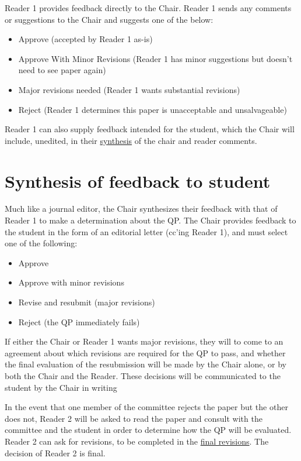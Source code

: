 \documentclass[
]{book}
\providecommand{\tightlist}{%
  \setlength{\itemsep}{0pt}\setlength{\parskip}{0pt}}
\begin{document}
Reader 1 provides feedback directly to the Chair. Reader 1 sends any comments or suggestions to the Chair and suggests one of the below:

\begin{itemize}
\tightlist
\item
  Approve (accepted by Reader 1 as-is)
\item
  Approve With Minor Revisions (Reader 1 has minor suggestions but doesn't need to see paper again)
\item
  Major revisions needed (Reader 1 wants substantial revisions)
\item
  Reject (Reader 1 determines this paper is unacceptable and unsalvageable)
\end{itemize}

Reader 1 can also supply feedback intended for the student, which the Chair will include, unedited, in their \protect\hyperlink{synthesis}{synthesis} of the chair and reader comments.

\hypertarget{synthesis}{%
\section{Synthesis of feedback to student}\label{synthesis}}

Much like a journal editor, the Chair synthesizes their feedback with that of Reader 1 to make a determination about the QP. The Chair provides feedback to the student in the form of an editorial letter (cc'ing Reader 1), and must select one of the following:

\begin{itemize}
\tightlist
\item
  Approve
\item
  Approve with minor revisions
\item
  Revise and resubmit (major revisions)
\item
  Reject (the QP immediately fails)
\end{itemize}

If either the Chair or Reader 1 wants major revisions, they will to come to an agreement about which revisions are required for the QP to pass, and whether the final evaluation of the resubmission will be made by the Chair alone, or by both the Chair and the Reader. These decisions will be communicated to the student by the Chair in writing

In the event that one member of the committee rejects the paper but the other does not, Reader 2 will be asked to read the paper and consult with the committee and the student in order to determine how the QP will be evaluated. Reader 2 can ask for revisions, to be completed in the \protect\hyperlink{revisions}{final revisions}. The decision of Reader 2 is final.
\end{document}
